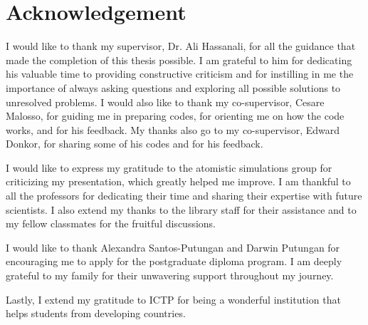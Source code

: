 \chapter*{Acknowledgement}




I would like to thank my supervisor, Dr. Ali Hassanali, for all the guidance that made the completion of this thesis possible. I am grateful to him for dedicating his valuable time to providing constructive criticism and for instilling in me the importance of always asking questions and exploring all possible solutions to unresolved problems. I would also like to thank my co-supervisor, Cesare Malosso, for guiding me in preparing codes, for orienting me on how the code works, and for his feedback. My thanks also go to my co-supervisor, Edward Donkor, for sharing some of his codes and for his feedback.

I would like to express my gratitude to the atomistic simulations group for criticizing my presentation, which greatly helped me improve. I am thankful to all the professors for dedicating their time and sharing their expertise with future scientists. I also extend my thanks to the library staff for their assistance and to my fellow classmates for the fruitful discussions.

I would like to thank Alexandra Santos-Putungan and Darwin Putungan for encouraging me to apply for the postgraduate diploma program. I am deeply grateful to my family for their unwavering support throughout my journey.

Lastly, I extend my gratitude to ICTP for being a wonderful institution that helps students from developing countries.
